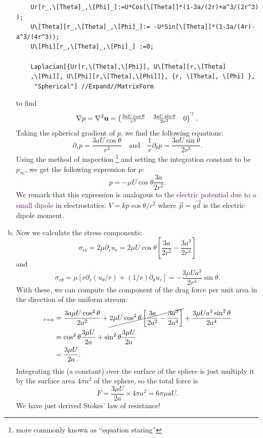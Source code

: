 \documentclass[11pt]{article}
\newcommand{\f}[2]{\frac{#1}{#2}}
\newcommand{\p}{\partial}%
\begin{document}
\begin{enumerate}[(a)]
	\begin{lstlisting}
	Ur[r_,\[Theta]_,\[Phi]_]:=U*Cos[\[Theta]]*(1-3a/(2r)+a^3/(2r^3) );
	U\[Theta][r_,\[Theta]_,\[Phi]_]:= -U*Sin[\[Theta]]*(1-3a/(4r)-a^3/(4r^3));
	U\[Phi][r_,\[Theta]_,\[Phi]_] :=0;
	
	Laplacian[{Ur[r,\[Theta],\[Phi]], U\[Theta][r,\[Theta]
	,\[Phi]], U\[Phi][r,\[Theta],\[Phi]]}, {r, \[Theta], \[Phi] },
	 "Spherical"] //Expand//MatrixForm 
	\end{lstlisting}	
	to find
	\begin{equation*}
	\nabla p = \laplacian \mathbf{u} = 
	\begin{pmatrix}
	\frac{3aU\cos\theta}{r^3}&
	\frac{3aU\sin\theta}{2r^3}&
	0
	\end{pmatrix}^\top.
	\end{equation*} 
	Taking the spherical gradient of $p$, we find the following equations:
	\begin{equation*}
	\p_r p = \frac{3aU\cos\theta}{r^3}\quad \text{and} \quad
	\f{1}{r}\p_\theta p = \frac{3aU\sin\theta}{2r^3}.
	\end{equation*}
	Using the method of inspection \footnote{more commonly known as ``equation staring''} and setting the integration constant to be $p_\infty$, we get the following expression for $p$:
	\begin{equation*}
	p = -\mu U \cos\theta \f{3a}{2r^2}.
	\end{equation*}
	We remark that this expression is analogous to the \textcolor{purple}{electric potential due to a small dipole} in electrostatics: $V = kp\cos\theta/r^2$ where $\vec{p} = q\vec{d}$ is the electric dipole moment.
	
	
	\item Now we calculate the stress components:
	\begin{equation*}
	\sigma_{rr}  = 2\mu \p_r u_r = 2\mu U\cos\theta \left[\f{3a}{2r^2} - \f{3a^3}{2r^4}\right]
	\end{equation*}
	and 
	\begin{equation*}
	\sigma_{r\theta} = \mu \left[r\p_r(u_\theta/r) + (1/r)\p_\theta u_r\right] = -\f{3\mu Ua^3}{2r^4}\sin\theta.
	\end{equation*}
	With these, we can compute the component of the drag force per unit area in the direction of the uniform stream:
	\begin{align*}
	[-p\cos\theta + \sigma_{rr}\cos\theta - \sigma_{r\theta}\sin\theta]_{r=a} &=  \f{3a\mu U \cos^2\theta}{2a^2} + \cancel{2\mu U\cos^2\theta \left[\f{3a}{2a^2} - \f{3a^3}{2a^4}\right]} + \f{3\mu Ua^3\sin^2\theta}{2a^4}\\
	&=  \cos^2\theta \f{3 \mu U}{2a} + \sin^2\theta\f{3\mu U}{2a}\\
	&= \f{3\mu U }{2a}.
	\end{align*}
	Integrating this (a constant) over the surface of the sphere is just multiply it by the surface area $4\pi a^2$ of the sphere, so the total force is
	\begin{equation*}
	F = \f{3\mu U }{2a}\times 4\pi a^2 = 6\pi \mu a U.
	\end{equation*}
	We have just derived Stokes' law of resistance!
\end{enumerate}
\end{document}

